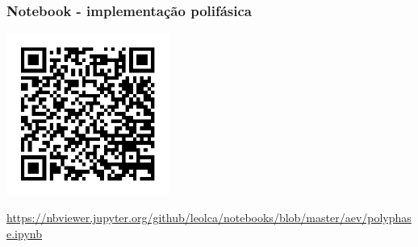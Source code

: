 \begin{frame}%
  \frametitle{Notebook - implementação polifásica}
    \centering
      \includegraphics[width=0.4\textwidth]{images/qrcode-jupyter-polyphase.pdf}

      \url{https://nbviewer.jupyter.org/github/leolca/notebooks/blob/master/aev/polyphase.ipynb}
\end{frame} 



